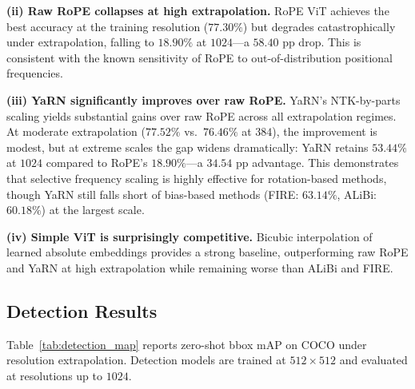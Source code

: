 \textbf{(ii) Raw RoPE collapses at high extrapolation.} RoPE ViT achieves the best accuracy at the
training resolution ($77.30\%$) but degrades catastrophically under extrapolation, falling to
$18.90\%$ at $1024$---a $58.40$ pp drop. This is consistent with the known sensitivity of RoPE to
out-of-distribution positional frequencies.

\textbf{(iii) YaRN significantly improves over raw RoPE.} YaRN's NTK-by-parts scaling yields substantial gains over raw RoPE across all extrapolation regimes. At moderate extrapolation ($77.52\%$ vs.\ $76.46\%$ at $384$), the improvement is modest, but at extreme scales the gap widens dramatically: YaRN retains $53.44\%$ at $1024$ compared to RoPE's $18.90\%$---a $34.54$ pp advantage. This demonstrates that selective frequency scaling is highly effective for rotation-based methods, though YaRN still falls short of bias-based methods (FIRE: $63.14\%$, ALiBi: $60.18\%$) at the largest scale.

\textbf{(iv) Simple ViT is surprisingly competitive.} Bicubic interpolation of learned absolute
embeddings provides a strong baseline, outperforming raw RoPE and YaRN at high extrapolation
while remaining worse than ALiBi and FIRE.

\subsection{Detection Results}

Table~\ref{tab:detection_map} reports zero-shot bbox mAP on COCO under resolution extrapolation.
Detection models are trained at $512 \times 512$ and evaluated at resolutions up to $1024$.

